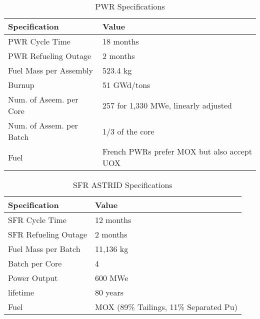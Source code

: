 \begin{table}[h]
	\centering
	\begin{tabularx}{\textwidth}{bb}
		\hline
		Specification & Value \\
		\hline
		PWR Cycle Time & 18 months \\ 
		PWR Refueling Outage & 2 months \\
		Fuel Mass per Assembly & 523.4 kg \\
		Burnup & 51 GWd/tons \\
		Num. of Aseem. per Core & 257 for 1,330 MWe, linearly adjusted\\
		Num. of Assem. per Batch & 1/3 of the core \\
		Fuel & \small{French \glspl{PWR} prefer \gls{MOX} but also accept \gls{UOX}}\\
		\hline
	\end{tabularx}
	\caption {\gls{PWR} Specifications}
	\label{tab:pwr}
	\end{table}
	
\begin{table}[h]
	\centering
	\begin{tabularx}{\textwidth}{bb}
		\hline
		Specification & Value \\
		\hline
		SFR Cycle Time & 12 months \\ 
		SFR Refueling Outage & 2 months \\
		Fuel Mass per Batch & 11,136 kg \\
		Batch per Core & 4 \\
		Power Output & 600 MWe \\
		lifetime & 80 years \\
		Fuel & {\small \gls{MOX} (89\% Tailings, 11\% Separated Pu)}\\
		\hline
	\end{tabularx}
	\caption {\gls{SFR} ASTRID Specifications}
	\cite{marsaultmarie-sophie_pre-conceptual_2012}
	\label{tab:sfr}
\end{table}

